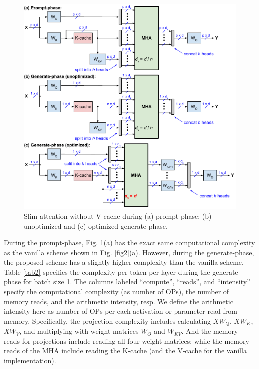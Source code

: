 \documentclass{article}
\begin{document}
\begin{figure}[h!] \centering
  \includegraphics[scale=0.9]{../doc/fig/slimAttn_fig3.pdf}
  \caption{Slim attention without V-cache during (a) prompt-phase; (b) unoptimized and (c) optimized generate-phase.}
\label{fig3} \end{figure}

During the prompt-phase, Fig. \ref{fig3}(a) has the exact same computational complexity as the vanilla scheme shown in Fig. \ref{fig2}(a). However, during the generate-phase, the proposed scheme has a slightly higher complexity than the vanilla scheme. Table \ref{tab2} specifies the complexity per token per layer during the generate-phase for batch size 1. The columns labeled ``compute'', ``reads'', and ``intensity'' specify the computational complexity (as number of OPs), the number of memory reads, and the arithmetic intensity, resp. We define the arithmetic intensity here as number of OPs per each activation or parameter read from memory. Specifically, the projection complexity includes calculating $X W_Q$, $X W_K$, $X W_V$, and multiplying with weight matrices $W_O$ and $W_{KV}$. And the memory reads for projections include reading all four weight matrices; while the memory reads of the MHA include reading the K-cache (and the V-cache for the vanilla implementation).
\end{document}
